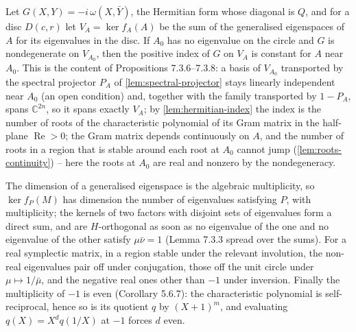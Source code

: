 \begin{proposition}
  \label{prop:7.3.6}
  \leanok
  Let $G(X, Y) = -i\,\omega(X, \bar Y)$, the Hermitian form whose diagonal is
  $Q$, and for a disc $D(c, r)$ let $V_A = \ker f_A(A)$ be the sum of the
  generalised eigenspaces of $A$ for its eigenvalues in the disc.  If $A_0$ has
  no eigenvalue on the circle and $G$ is nondegenerate on $V_{A_0}$, then the
  positive index of $G$ on $V_A$ is constant for $A$ near $A_0$.  This is the
  content of Propositions 7.3.6--7.3.8: a basis of $V_{A_0}$ transported by the
  spectral projector $P_A$ of \ref{lem:spectral-projector} stays linearly
  independent near $A_0$ (an open condition) and, together with the family
  transported by $1 - P_A$, spans $\mathbb{C}^{2n}$, so it spans exactly
  $V_A$; by \ref{lem:hermitian-index} the index is the number of roots of the
  characteristic polynomial of its Gram matrix in the half-plane
  $\operatorname{Re} > 0$; the Gram matrix depends continuously on $A$, and
  the number of roots in a region that is stable around each root at $A_0$
  cannot jump (\ref{lem:roots-continuity}) -- here the roots at $A_0$ are real
  and nonzero by the nondegeneracy.
\end{proposition}

\begin{lemma}
  \label{lem:eigen-mult}
  \leanok
  The dimension of a generalised eigenspace is the algebraic multiplicity, so
  $\ker f_P(M)$ has dimension the number of eigenvalues satisfying $P$, with
  multiplicity; the kernels of two factors with disjoint sets of eigenvalues
  form a direct sum, and are $H$-orthogonal as soon as no eigenvalue of the one
  and no eigenvalue of the other satisfy $\mu\bar\nu = 1$ (Lemma 7.3.3 spread
  over the sums).  For a real symplectic matrix, in a region stable under the
  relevant involution, the non-real eigenvalues pair off under conjugation,
  those off the unit circle under $\mu \mapsto 1/\bar\mu$, and the negative
  real ones other than $-1$ under inversion.  Finally the multiplicity of $-1$
  is even (Corollary 5.6.7): the characteristic polynomial is self-reciprocal,
  hence so is its quotient $q$ by $(X+1)^m$, and evaluating $q(X) = X^{d} q(1/X)$
  at $-1$ forces $d$ even.
\end{lemma}

